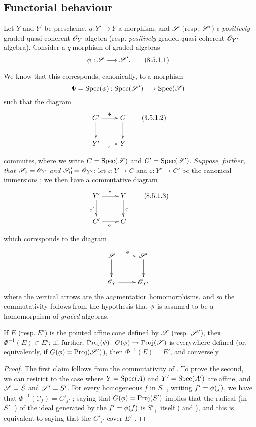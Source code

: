 \subsection{Functorial behaviour}
\label{subsection:II.8.5}

\begin{env}[8.5.1]
\label{II.8.5.1}
Let $Y$ and $Y'$ be prescheme, $q:Y'\to Y$ a morphism, and $\mathscr{S}$ (resp. $\mathscr{S}'$) a \emph{positively}-graded quasi-coherent $\mathscr{O}_Y$-algebra (resp. \emph{positively}-graded quasi-coherent $\mathscr{O}_{Y'}$-algebra).
Consider a $q$-morphism of graded algebras
\[
\label{eq:2.8.5.1.1}
  \vphi: \sh{S} \to \sh{S}'.
\tag{8.5.1.1}
\]

We know  that this corresponds, canonically, to a morphism
\[
  \Phi = \Spec(\vphi): \Spec(\sh{S}') \to \Spec(\sh{S})
\]
such that the diagram
\[
\label{eq:2.8.5.1.2}
  \xymatrix{
    C'
      \ar[r]^{\Phi}
      \ar[d]
  & C
      \ar[d]
  \\Y'
      \ar[r]_{q}
  & Y
  }
\tag{8.5.1.2}
\]
commutes, where we write $C=\operatorname{Spec}(\mathscr{S})$ and $C'=\operatorname{Spec}(\mathscr{S}')$.
\emph{Suppose, further, that $\mathscr{S}_0=\mathscr{O}_Y$ and $\mathscr{S}'_0=\mathscr{O}_{Y'}$};
let $\varepsilon:Y\to C$ and $\varepsilon:Y'\to C'$ be the canonical immersions ;
we then have a commutative diagram
\[
\label{eq:2.8.5.1.3}
  \xymatrix{
    Y'
      \ar[r]^{q}
      \ar[d]_{\varepsilon'}
  & Y
      \ar[d]^{\varepsilon}
  \\C'
      \ar[r]_{\Phi}
  & C
  }
\tag{8.5.1.3}
\]
which corresponds to the diagram
\[
  \xymatrix{
    \sh{S}
      \ar[r]^{\vphi}
      \ar[d]
  & \sh{S}'
      \ar[d]
  \\\sh{O}_Y
      \ar[r]
  & \sh{O}_{Y'}
  }
\]
where the vertical arrows are the augmentation homomorphisms, and so the commutativity follows from the hypothesis that $\phi$ is assumed to be a homomorphism of \emph{graded} algebras.
\end{env}

\begin{proposition}[8.5.2]
\label{II.8.5.2}
If $E$ (resp. $E'$) is the pointed affine cone defined by $\mathscr{S}$ (resp. $\mathscr{S}'$), then $\Phi^{-1}(E)\subset E'$;
if, further, $\Proj(\vphi):G(\vphi)\to\Proj(\sh{S})$ is everywhere defined (or, equivalently, if $G(\phi)=\operatorname{Proj}(\mathscr{S}')$), then $\Phi^{-1}(E)=E'$, and conversely.
\end{proposition}

\begin{proof}
The first claim follows from the commutativity of .
To prove the second, we can restrict to the case where $Y=\operatorname{Spec}(A)$ and $Y'=\operatorname{Spec}(A')$ are affine, and $\mathscr{S}=\widetilde{S}$ and $\mathscr{S}'=\widetilde{S'}$.
For every homogeneous $f$ in $S_+$, writing $f'=\phi(f)$, we have that $\Phi^{-1}(C_f)=C'_{f'}$ ;
saying that $G(\phi)=\operatorname{Proj}(S')$ implies that the radical (in $S'_+$) of the ideal generated by the $f'=\phi(f)$ is $S'_+$ itself ( and ), and this is equivalent to saying that the $C'_{f'}$ cover $E'$ .
\end{proof}

